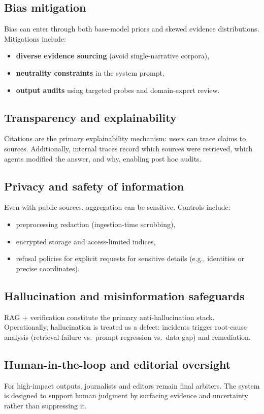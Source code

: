 \subsection{Bias mitigation}
Bias can enter through both base-model priors and skewed evidence distributions.
Mitigations include:
\begin{itemize}
    \item \textbf{diverse evidence sourcing} (avoid single-narrative corpora),
    \item \textbf{neutrality constraints} in the system prompt,
    \item \textbf{output audits} using targeted probes and domain-expert review.
\end{itemize}

\subsection{Transparency and explainability}
Citations are the primary explainability mechanism: users can trace claims to sources.
Additionally, internal traces record which sources were retrieved, which agents modified the answer, and why, enabling post hoc audits.

\subsection{Privacy and safety of information}
Even with public sources, aggregation can be sensitive.
Controls include:
\begin{itemize}
    \item preprocessing redaction (ingestion-time scrubbing),
    \item encrypted storage and access-limited indices,
    \item refusal policies for explicit requests for sensitive details (e.g., identities or precise coordinates).
\end{itemize}

\subsection{Hallucination and misinformation safeguards}
RAG + verification constitute the primary anti-hallucination stack.
Operationally, hallucination is treated as a defect: incidents trigger root-cause analysis (retrieval failure vs.\ prompt regression vs.\ data gap) and remediation.

\subsection{Human-in-the-loop and editorial oversight}
For high-impact outputs, journalists and editors remain final arbiters.
The system is designed to support human judgment by surfacing evidence and uncertainty rather than suppressing it.

